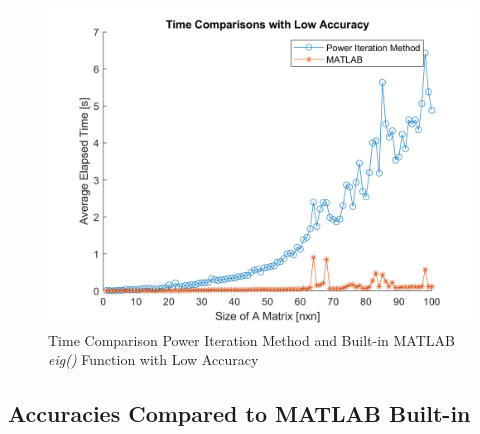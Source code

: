 \documentclass[letterpaper,12pt]{article}
\begin{document}
\begin{figure}[H] 
   \centering \includegraphics[width=\columnwidth]{figures/poweriterationtimelowtol.png}           
                  \caption{Time Comparison Power Iteration Method and Built-in MATLAB \textit{eig()} Function with Low Accuracy}                
                     \label{fig:poweriterationtimelowtol}
   \end{figure}

   \subsection{Accuracies Compared to MATLAB Built-in}
\end{document}

